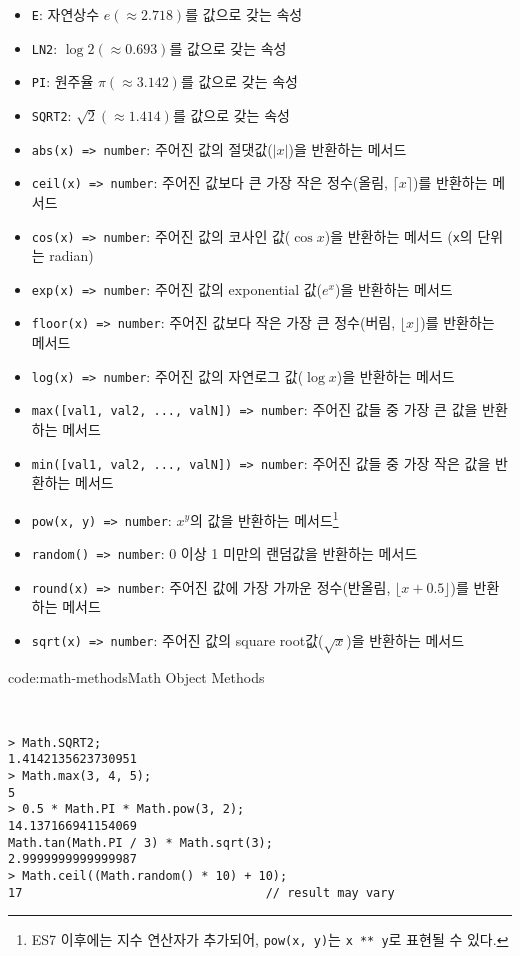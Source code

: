 \begin{itemize}
    \item \texttt{E}: 자연상수 $e (\approx 2.718)$를 값으로 갖는 속성
    \item \texttt{LN2}: $\log 2 (\approx 0.693)$를 값으로 갖는 속성
    \item \texttt{PI}: 원주율 $\pi (\approx 3.142)$를 값으로 갖는 속성
    \item \texttt{SQRT2}: $\sqrt 2 (\approx 1.414)$를 값으로 갖는 속성
    \item \texttt{abs(x) => number}: 주어진 값의 절댓값($|x|$)을 반환하는 메서드
    \item \texttt{ceil(x) => number}: 주어진 값보다 큰 가장 작은 정수(올림, $\lceil x\rceil$)를 반환하는 메서드
    \item \texttt{cos(x) => number}: 주어진 값의 코사인 값($\cos x$)을 반환하는 메서드 (\texttt{x}의 단위는 radian)
    \item \texttt{exp(x) => number}: 주어진 값의 exponential 값($e^x$)을 반환하는 메서드
    \item \texttt{floor(x) => number}: 주어진 값보다 작은 가장 큰 정수(버림, $\lfloor x\rfloor$)를 반환하는 메서드
    \item \texttt{log(x) => number}: 주어진 값의 자연로그 값($\log x$)을 반환하는 메서드
    \item \texttt{max([val1, val2, ..., valN]) => number}: 주어진 값들 중 가장 큰 값을 반환하는 메서드
    \item \texttt{min([val1, val2, ..., valN]) => number}: 주어진 값들 중 가장 작은 값을 반환하는 메서드
    \item \texttt{pow(x, y) => number}: $x^y$의 값을 반환하는 메서드\footnote{ES7 이후에는 지수 연산자가 추가되어, \texttt{pow(x, y)}는 \texttt{x ** y}로 표현될 수 있다.}
    \item \texttt{random() => number}: 0 이상 1 미만의 랜덤값을 반환하는 메서드
    \item \texttt{round(x) => number}: 주어진 값에 가장 가까운 정수(반올림, $\lfloor x + 0.5\rfloor$)를 반환하는 메서드
    \item \texttt{sqrt(x) => number}: 주어진 값의 square root값($\sqrt{x}$)을 반환하는 메서드
\end{itemize}

\begin{codeenv}{code:math-methods}{Math Object Methods}\begin{verbatim}


> Math.SQRT2;
1.4142135623730951
> Math.max(3, 4, 5);
5
> 0.5 * Math.PI * Math.pow(3, 2);
14.137166941154069
Math.tan(Math.PI / 3) * Math.sqrt(3);
2.9999999999999987
> Math.ceil((Math.random() * 10) + 10);
17                                  // result may vary
\end{verbatim}
\end{codeenv}
